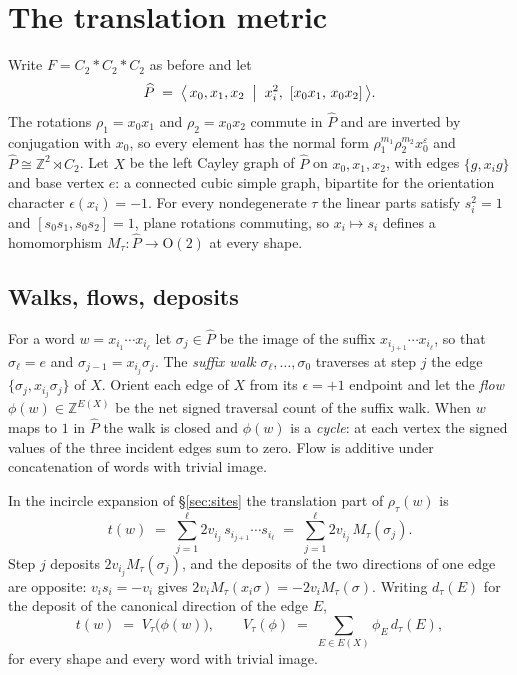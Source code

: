 \documentclass[11pt]{article}
\theoremstyle{definition}
\theoremstyle{remark}
\newcommand{\Z}{\mathbb{Z}}
\begin{document}
\section{The translation metric}\label{sec:flow}

Write $F=C_2*C_2*C_2$ as before and let
\[
\widehat P \;=\; \bigl\langle\, x_0,x_1,x_2 \;\bigm|\; x_i^2,\
[x_0x_1,\,x_0x_2]\,\bigr\rangle .
\]
The rotations $\rho_1=x_0x_1$ and $\rho_2=x_0x_2$ commute in $\widehat P$ and
are inverted by conjugation with $x_0$, so every element has the normal form
$\rho_1^{m_1}\rho_2^{m_2}x_0^{\varepsilon}$ and $\widehat P\cong\Z^2\rtimes
C_2$. Let $X$ be the left Cayley graph of $\widehat P$ on $x_0,x_1,x_2$, with
edges $\{g,x_ig\}$ and base vertex $e$: a connected cubic simple graph,
bipartite for the orientation character $\epsilon(x_i)=-1$. For every
nondegenerate $\tau$ the linear parts satisfy $s_i^2=1$ and
$[s_0s_1,s_0s_2]=1$, plane rotations commuting, so $x_i\mapsto s_i$ defines a
homomorphism $M_\tau\colon\widehat P\to\mathrm O(2)$ at every shape.

\subsection{Walks, flows, deposits}

For a word $w=x_{i_1}\cdots x_{i_\ell}$ let $\sigma_j\in\widehat P$ be the
image of the suffix $x_{i_{j+1}}\cdots x_{i_\ell}$, so that $\sigma_\ell=e$
and $\sigma_{j-1}=x_{i_j}\sigma_j$. The \emph{suffix walk}
$\sigma_\ell,\dots,\sigma_0$ traverses at step $j$ the edge
$\{\sigma_j,x_{i_j}\sigma_j\}$ of $X$. Orient each edge of $X$ from its
$\epsilon=+1$ endpoint and let the \emph{flow} $\phi(w)\in\Z^{E(X)}$ be the
net signed traversal count of the suffix walk. When $w$ maps to $1$ in
$\widehat P$ the walk is closed and $\phi(w)$ is a \emph{cycle}: at each
vertex the signed values of the three incident edges sum to zero. Flow is
additive under concatenation of words with trivial image.

In the incircle expansion of \S\ref{sec:sites} the translation part of
$\rho_\tau(w)$ is
\[
 t(w)\;=\;\sum_{j=1}^{\ell} 2v_{i_j}\,s_{i_{j+1}}\cdots s_{i_\ell}
 \;=\;\sum_{j=1}^{\ell} 2v_{i_j}\,M_\tau(\sigma_j).
\]
Step $j$ deposits $2v_{i_j}M_\tau(\sigma_j)$, and the deposits of the two
directions of one edge are opposite: $v_is_i=-v_i$ gives
$2v_iM_\tau(x_i\sigma)=-2v_iM_\tau(\sigma)$. Writing $d_\tau(E)$ for the
deposit of the canonical direction of the edge $E$,
\begin{equation}\label{eq:flow}
 t(w)\;=\;V_\tau\bigl(\phi(w)\bigr),\qquad
 V_\tau(\phi)\;=\;\sum_{E\in E(X)}\phi_E\, d_\tau(E),
\end{equation}
for every shape and every word with trivial image.
\end{document}
